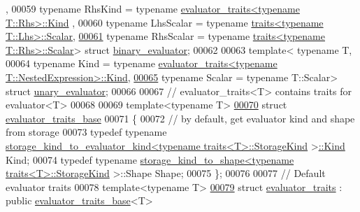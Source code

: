 \begin{DoxyCode}
      ,
00059           \textcolor{keyword}{typename} RhsKind   = \textcolor{keyword}{typename} \hyperlink{struct_eigen_1_1internal_1_1_index_based}{evaluator\_traits<typename T::Rhs>::Kind}
      ,
00060           \textcolor{keyword}{typename} LhsScalar = \textcolor{keyword}{typename} \hyperlink{struct_eigen_1_1internal_1_1traits}{traits<typename T::Lhs>::Scalar},
\hyperlink{struct_eigen_1_1internal_1_1binary__evaluator}{00061}           \textcolor{keyword}{typename} RhsScalar = \textcolor{keyword}{typename} \hyperlink{struct_eigen_1_1internal_1_1traits}{traits<typename T::Rhs>::Scalar}> \textcolor{keyword}{
      struct }\hyperlink{struct_eigen_1_1internal_1_1binary__evaluator}{binary\_evaluator};
00062 
00063 \textcolor{keyword}{template}< \textcolor{keyword}{typename} T,
00064           \textcolor{keyword}{typename} Kind   = \textcolor{keyword}{typename} 
      \hyperlink{struct_eigen_1_1internal_1_1_index_based}{evaluator\_traits<typename T::NestedExpression>::Kind},
\hyperlink{struct_eigen_1_1internal_1_1unary__evaluator}{00065}           \textcolor{keyword}{typename} Scalar = \textcolor{keyword}{typename} T::Scalar> \textcolor{keyword}{struct }\hyperlink{struct_eigen_1_1internal_1_1unary__evaluator}{unary\_evaluator};
00066           
00067 \textcolor{comment}{// evaluator\_traits<T> contains traits for evaluator<T> }
00068 
00069 \textcolor{keyword}{template}<\textcolor{keyword}{typename} T>
\hyperlink{struct_eigen_1_1internal_1_1evaluator__traits__base}{00070} \textcolor{keyword}{struct }\hyperlink{struct_eigen_1_1internal_1_1evaluator__traits__base}{evaluator\_traits\_base}
00071 \{
00072   \textcolor{comment}{// by default, get evaluator kind and shape from storage}
00073   \textcolor{keyword}{typedef} \textcolor{keyword}{typename} 
      \hyperlink{struct_eigen_1_1internal_1_1storage__kind__to__evaluator__kind}{storage\_kind\_to\_evaluator\_kind<typename traits<T>::StorageKind}
      >\hyperlink{struct_eigen_1_1internal_1_1_index_based}{::Kind} Kind;
00074   \textcolor{keyword}{typedef} \textcolor{keyword}{typename} \hyperlink{struct_eigen_1_1internal_1_1storage__kind__to__shape}{storage\_kind\_to\_shape<typename traits<T>::StorageKind}
      >::Shape Shape;
00075 \};
00076 
00077 \textcolor{comment}{// Default evaluator traits}
00078 \textcolor{keyword}{template}<\textcolor{keyword}{typename} T>
\hyperlink{struct_eigen_1_1internal_1_1evaluator__traits}{00079} \textcolor{keyword}{struct }\hyperlink{struct_eigen_1_1internal_1_1evaluator__traits}{evaluator\_traits} : \textcolor{keyword}{public} \hyperlink{struct_eigen_1_1internal_1_1evaluator__traits__base}{evaluator\_traits\_base}<T>

\end{DoxyCode}
